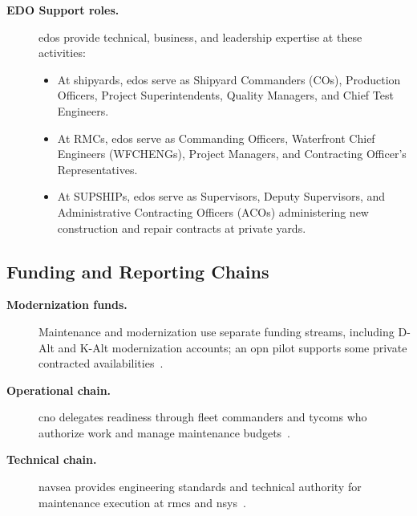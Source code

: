 \documentclass[../main.tex]{subfiles}
\begin{document}
\begin{description}
  \item[\textbf{EDO Support roles.}] \acp{edo} provide technical, business, and leadership expertise at these activities:
    \begin{itemize}
      \item At shipyards, \acp{edo} serve as Shipyard Commanders (COs), Production Officers, Project Superintendents, Quality Managers, and Chief Test Engineers.
      \item At RMCs, \acp{edo} serve as Commanding Officers, Waterfront Chief Engineers (WFCHENGs), Project Managers, and Contracting Officer's Representatives.
      \item At SUPSHIPs, \acp{edo} serve as Supervisors, Deputy Supervisors, and Administrative Contracting Officers (ACOs) administering new construction and repair contracts at private yards.
    \end{itemize}
\end{description}

\subsection{Funding and Reporting Chains}
\begin{description}
  \item[\textbf{Modernization funds.}] Maintenance and modernization use separate funding streams, including D-Alt and K-Alt modernization accounts; an \ac{opn} pilot supports some private contracted availabilities~\autocite{edo-4-1-1-fleet-maint-assets-2025}.
  \item[\textbf{Operational chain.}] \ac{cno} delegates readiness through fleet commanders and \acp{tycom} who authorize work and manage maintenance budgets~\autocite{edo-4-1-1-fleet-maint-assets-2025}.
  \item[\textbf{Technical chain.}] \ac{navsea} provides engineering standards and technical authority for maintenance execution at \acp{rmc} and \acp{nsy}~\autocite{edo-4-1-1-fleet-maint-assets-2025}.
\end{description}
\end{document}
